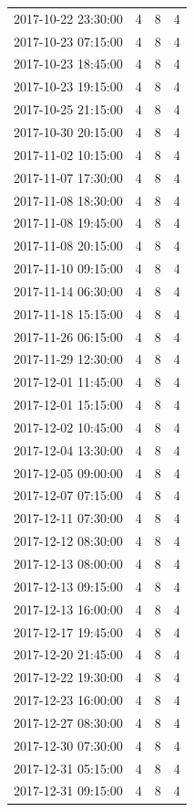 \begin{tabular}{lrrr}
2017-10-22 23:30:00 & 4 & 8 & 4 \\
2017-10-23 07:15:00 & 4 & 8 & 4 \\
2017-10-23 18:45:00 & 4 & 8 & 4 \\
2017-10-23 19:15:00 & 4 & 8 & 4 \\
2017-10-25 21:15:00 & 4 & 8 & 4 \\
2017-10-30 20:15:00 & 4 & 8 & 4 \\
2017-11-02 10:15:00 & 4 & 8 & 4 \\
2017-11-07 17:30:00 & 4 & 8 & 4 \\
2017-11-08 18:30:00 & 4 & 8 & 4 \\
2017-11-08 19:45:00 & 4 & 8 & 4 \\
2017-11-08 20:15:00 & 4 & 8 & 4 \\
2017-11-10 09:15:00 & 4 & 8 & 4 \\
2017-11-14 06:30:00 & 4 & 8 & 4 \\
2017-11-18 15:15:00 & 4 & 8 & 4 \\
2017-11-26 06:15:00 & 4 & 8 & 4 \\
2017-11-29 12:30:00 & 4 & 8 & 4 \\
2017-12-01 11:45:00 & 4 & 8 & 4 \\
2017-12-01 15:15:00 & 4 & 8 & 4 \\
2017-12-02 10:45:00 & 4 & 8 & 4 \\
2017-12-04 13:30:00 & 4 & 8 & 4 \\
2017-12-05 09:00:00 & 4 & 8 & 4 \\
2017-12-07 07:15:00 & 4 & 8 & 4 \\
2017-12-11 07:30:00 & 4 & 8 & 4 \\
2017-12-12 08:30:00 & 4 & 8 & 4 \\
2017-12-13 08:00:00 & 4 & 8 & 4 \\
2017-12-13 09:15:00 & 4 & 8 & 4 \\
2017-12-13 16:00:00 & 4 & 8 & 4 \\
2017-12-17 19:45:00 & 4 & 8 & 4 \\
2017-12-20 21:45:00 & 4 & 8 & 4 \\
2017-12-22 19:30:00 & 4 & 8 & 4 \\
2017-12-23 16:00:00 & 4 & 8 & 4 \\
2017-12-27 08:30:00 & 4 & 8 & 4 \\
2017-12-30 07:30:00 & 4 & 8 & 4 \\
2017-12-31 05:15:00 & 4 & 8 & 4 \\
2017-12-31 09:15:00 & 4 & 8 & 4 \\

\end{tabular}
